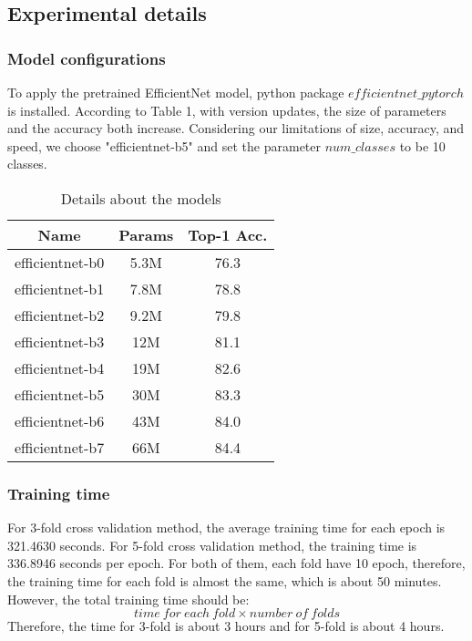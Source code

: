 \documentclass[final]{cvpr}
\begin{document}
    \subsection{Experimental details}
 

    \subsubsection{Model configurations}
    To apply the pretrained EfficientNet model, python package \href{https://github.com/lukemelas/EfficientNet-PyTorch#about-efficientnet-pytorch}{$efficientnet\_pytorch$} is installed. According to Table 1, with version updates, the size of parameters and the accuracy both increase. Considering our limitations of size, accuracy, and speed, we choose "efficientnet-b5" and set the parameter $num\_classes$ to be 10 classes.
    \begin{table}[htbp]
        \centering
        \begin{tabular}{c|c|c}
            Name            & Params & Top-1 Acc.\\
            \hline
            efficientnet-b0 &  5.3M  & 76.3\\
            efficientnet-b1 &  7.8M  & 78.8  \\
            efficientnet-b2 &  9.2M  & 79.8  \\
            efficientnet-b3 &  12M  & 81.1  \\
            efficientnet-b4 &  19M  & 82.6  \\
            efficientnet-b5 &  30M  & 83.3  \\
            efficientnet-b6 &  43M  & 84.0  \\
            efficientnet-b7 &  66M  & 84.4  \\
        \end{tabular}
        \caption{Details about the models}
        \label{tab:my_label}
    \end{table}

    \subsubsection{Training time}
    For 3-fold cross validation method, the average training time for each epoch is 321.4630 seconds. For 5-fold cross validation method, the training time is 336.8946 seconds per epoch. For both of them, each fold have 10 epoch, therefore, the training time for each fold is almost the same, which is about 50 minutes. However, the total training time should be: $$time\ for\ each\ fold \times number\ of\ folds$$Therefore, the time for 3-fold is about 3 hours and for 5-fold is about 4 hours.
\end{document}
